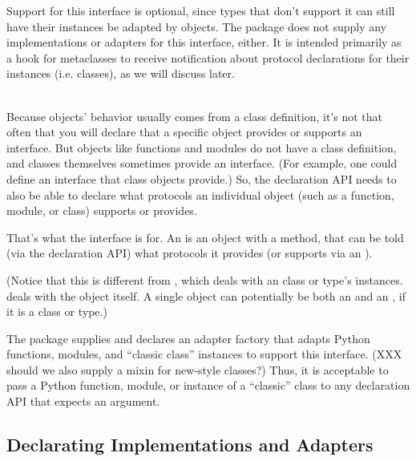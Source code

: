 \begin{verbatim%
}
\begin{verbatim%
}
\begin{verbatim%
}
\begin{verbatim%
}
\begin{description}
Support for this interface is optional, since types that don't support it
can still have their instances be adapted by  objects.
The  package does not supply any implementations or adapters
for this interface, either.  It is intended primarily as a hook for metaclasses
to receive notification about protocol declarations for their instances (i.e.
classes), as we will discuss later.




\item[IOpenProvider] \hfill \\
Because objects' behavior usually comes from a class definition, it's not that
often that you will declare that a specific object provides or supports an
interface.  But objects like functions and modules do not have a class
definition, and classes themselves sometimes provide an interface.  (For
example, one could define an  interface that class objects
provide.)  So, the declaration API needs to also be able to declare what
protocols an individual object (such as a function, module, or class) supports
or provides.

That's what the  interface is for.  An
 is an object with a  method, that can
be told (via the declaration API) what protocols it provides (or supports via
an ).

(Notice that this is different from , which deals with
an class or type's instances.   deals with the object
itself.  A single object can potentially be both an  and an
, if it is a class or type.)

The  package supplies and declares an adapter factory that
adapts Python functions, modules, and ``classic class'' instances to support
this interface.  (XXX should we also supply a mixin for new-style classes?)
Thus, it is acceptable to pass a Python function, module, or instance of a
``classic'' class to any declaration API that expects an 
argument.

\end{description}













\subsection{Declarating Implementations and Adapters}


\end{verbatim%
}
\end{verbatim%
}
\end{verbatim%
}
\end{verbatim%
}

